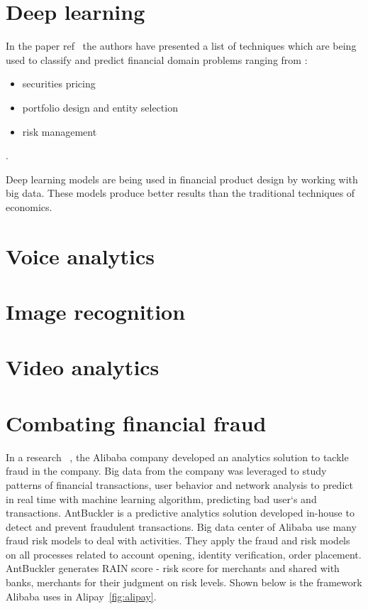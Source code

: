 \section{Deep learning}
In the paper ref~ the authors have presented a list of techniques which are being used to classify and predict financial domain problems ranging from :
\begin{itemize}
	\item securities pricing
	\item portfolio design and entity selection
	\item risk management
\end{itemize}.

Deep learning models are being used in financial product design by working with big data. These models produce better results than the traditional techniques of economics. 

\section{Voice analytics}



\section{Image recognition}



\section{Video analytics}



\setlength{\footskip}{8mm}


\newpage
\section{Combating financial fraud}
In a research~ , the Alibaba company developed an analytics solution to tackle fraud in the company. Big data from the company was leveraged to study patterns of financial transactions, user behavior and network analysis to predict in real time with machine learning algorithm, predicting bad user`s and transactions. AntBuckler is a predictive analytics solution developed in-house to detect and prevent fraudulent transactions. Big data center of Alibaba use many fraud risk models to deal with activities. They apply the fraud and risk models on all processes related to account opening, identity verification, order placement. AntBuckler generates RAIN score - risk score for merchants and shared with banks, merchants for their judgment on risk levels.
\newline
Shown below is the framework Alibaba uses in Alipay~\ref{fig:alipay}.

